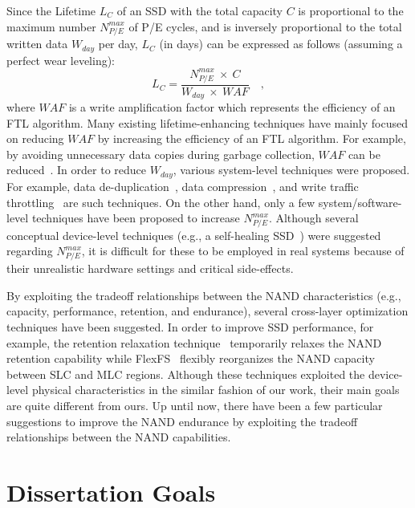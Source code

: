 Since the Lifetime $L_{C}$ of an SSD with the total capacity $C$ is proportional to the maximum number $N_{P/E}^{max}$ of P/E cycles, and is inversely proportional to the total written data $W_{day}$ per day, $L_{C}$ (in days) can be expressed as follows (assuming a perfect wear leveling):
\begin{equation}\label{eq:introduction_1}
L_{C} = \frac{N_{P/E}^{max}\: \times \: C}{W_{day}\: \times \: WAF} \quad ,
\end{equation}
where $WAF$ is a write amplification factor which represents the efficiency of an FTL algorithm.
Many existing lifetime-enhancing techniques have mainly focused on reducing $WAF$ by increasing the efficiency of an FTL algorithm.
For example, by avoiding unnecessary data copies during garbage collection, $WAF$ can be reduced~\cite{HotCold_Hsieh}.
In order to reduce $W_{day}$, various system-level techniques were proposed.
For example, data de-duplication~\cite{CAFTL_Chen}, data compression~\cite{Compression_Lee}, and write traffic throttling~\cite{DT_Lee} are such techniques.
On the other hand, only a few system/software-level techniques have been proposed to increase $N_{P/E}^{max}$.
Although several conceptual device-level techniques (e.g., a self-healing SSD~\cite{SelfHealing_Wu}) were suggested regarding $N_{P/E}^{max}$, it is difficult for these to be employed in real systems because of their unrealistic hardware settings and critical side-effects.

By exploiting the tradeoff relationships between the NAND characteristics (e.g., capacity, performance, retention, and endurance), several cross-layer optimization techniques have been suggested.
In order to improve SSD performance, for example, the retention relaxation technique~\cite{RetentionRelaxation_Liu} temporarily relaxes the NAND retention capability while FlexFS~\cite{Flexfs_Lee} flexibly reorganizes the NAND capacity between SLC and MLC regions.
Although these techniques exploited the device-level physical characteristics in the similar fashion of our work, their main goals are quite different from ours.
Up until now, there have been a few particular suggestions to improve the NAND endurance by exploiting the tradeoff relationships between the NAND capabilities.


\section{Dissertation Goals}
\label{sec:Intro_ResearchGoals}

